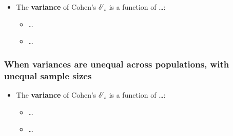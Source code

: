 \documentclass[
  man]{apa6}
\providecommand{\tightlist}{%
  \setlength{\itemsep}{0pt}\setlength{\parskip}{0pt}}
\begin{document}
\begin{itemize}
\tightlist
\item
  The \textbf{variance} of Cohen's \(\delta'_s\) is a function of \ldots:

  \begin{itemize}
  \tightlist
  \item
    \ldots{}
  \item
    \ldots{}
  \end{itemize}
\end{itemize}

\hypertarget{when-variances-are-unequal-across-populations-with-unequal-sample-sizes-4}{%
\subsubsection{When variances are unequal across populations, with unequal sample sizes}\label{when-variances-are-unequal-across-populations-with-unequal-sample-sizes-4}}

\begin{itemize}
\tightlist
\item
  The \textbf{variance} of Cohen's \(\delta'_s\) is a function of \ldots:

  \begin{itemize}
  \tightlist
  \item
    \ldots{}
  \item
    \ldots{}
  \end{itemize}
\end{itemize}
\end{document}
